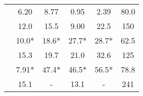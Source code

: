 \begin{table}[]
\begin{tabular}{l|cc|cc|c}
		\citet{Greco2012}                              & 6.20                          & 8.77                          & 0.95                          & 2.39                                                       & 80.0                      \\
		\citet{Lee2012}                                & 12.0                         & 15.5                         & 9.00                          & 22.5                                                      & 150                     \\
		\citet{Ariyarathne2012}                        & 10.0*                         & 18.6*                         & 27.7*                         & 28.7*                                                      & 62.5                      \\
		\citet{Abdussamie2017}                         & 15.3                         & 19.7                         & 21.0                         & 32.6                                                       & 125                     \\
		\citet{Scharnke2017}                          & 7.91*                          & 47.4*                         & 46.5*                        & 56.5*                                                      & 78.8                      \\
		\citet{Lee2020}                                & 15.1                         & -                          & 13.1                         & -                                                      & 241                   
	\end{tabular}
\label{tab:lit_waves_exp}
\end{table}

